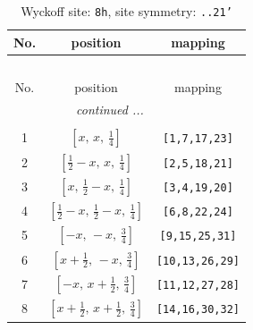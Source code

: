 \documentclass[fleqn,8pt]{jsarticle}
\begin{document}
\begin{longtable}{ccc}
\caption{Wyckoff site: {\tt 8h}, site symmetry: {\tt ..21'}}
 \\
 \hline \hline
No. & position & mapping \\ \hline \endfirsthead

\multicolumn{2}{l}{\tablename\ \thetable{}} \\
 \hline \hline
No. & position & mapping \\ \hline \endhead

 \hline \hline
\multicolumn{2}{r}{\footnotesize\it continued ...} \\ \endfoot

 \hline \hline
\multicolumn{2}{r}{} \\ \endlastfoot

1 & $\left[ x,\, x,\, \frac{1}{4} \right]$ & {\tt [1,7,17,23]} \\ \hline
2 & $\left[ \frac{1}{2} - x,\, x,\, \frac{1}{4} \right]$ & {\tt [2,5,18,21]} \\ \hline
3 & $\left[ x,\, \frac{1}{2} - x,\, \frac{1}{4} \right]$ & {\tt [3,4,19,20]} \\ \hline
4 & $\left[ \frac{1}{2} - x,\, \frac{1}{2} - x,\, \frac{1}{4} \right]$ & {\tt [6,8,22,24]} \\ \hline
5 & $\left[ - x,\, - x,\, \frac{3}{4} \right]$ & {\tt [9,15,25,31]} \\ \hline
6 & $\left[ x + \frac{1}{2},\, - x,\, \frac{3}{4} \right]$ & {\tt [10,13,26,29]} \\ \hline
7 & $\left[ - x,\, x + \frac{1}{2},\, \frac{3}{4} \right]$ & {\tt [11,12,27,28]} \\ \hline
8 & $\left[ x + \frac{1}{2},\, x + \frac{1}{2},\, \frac{3}{4} \right]$ & {\tt [14,16,30,32]} \\
\end{longtable}
\renewcommand{\arraystretch}{1.2}
\end{document}
